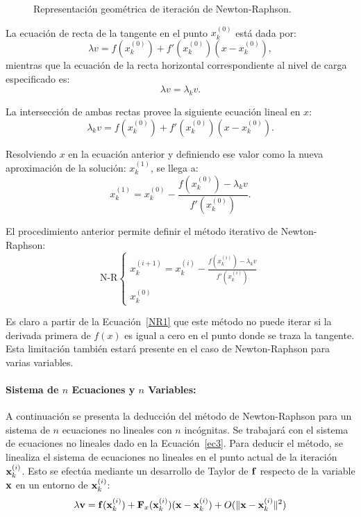 \begin{figure}[htb]
	\centering
   \def\svgwidth{0.7\textwidth}

	\caption{Representación geométrica de iteración de Newton-Raphson.}
	\label{fig:fig2}
\end{figure}

La ecuación de recta de la tangente en el punto $x_k^{(0)}$ está dada por:
%
\begin{equation}
	\lambda v = f(x_k^{(0)})+f'(x_k^{(0)})(x-x_k^{(0)}),
\end{equation}
%
mientras que la ecuación de la recta horizontal correspondiente al nivel de carga especificado es:
%
\begin{equation}
	\lambda v = \lambda_k v.
\end{equation}

La intersección de ambas rectas provee la siguiente ecuación lineal en $x$:
%
\begin{equation}
\lambda_k v = f(x_k^{(0)})+f'(x_k^{(0)})(x-x_k^{(0)}).
\end{equation}

Resolviendo $x$ en la ecuación anterior y definiendo ese valor como la nueva aproximación de la solución: $x_k^{(1)}$,
se llega a:
%
\begin{equation}
x_k^{(1)}=x_k^{(0)}-\frac{f(x_k^{(0)})-\lambda_k v}{f'(x_k^{(0)})}.
\end{equation}

El procedimiento anterior permite definir el método iterativo de Newton-Raphson:
%
\begin{equation}\label{NR1}
\text{N-R}
	\begin{cases} 
	\displaystyle
		x_k^{(i+1)}=x_k^{(i)}-\frac{f(x_k^{(i)})-\lambda_k v}{f'(x_k^{(i)})} \\
		x_k^{(0)}
	\end{cases}
\end{equation}

Es claro a partir de la Ecuación~\eqref{NR1} que este método no puede iterar si la derivada primera de $f(x)$ es igual a cero en el punto donde se traza la tangente. Esta limitación también estará presente en el caso de Newton-Raphson para varias variables.


\paragraph{Sistema de $n$ Ecuaciones y $n$ Variables:} %
%
A continuación se presenta la deducción del método de Newton-Raphson para un sistema de $n$ ecuaciones no lineales con $n$ incógnitas. Se trabajará con el sistema de ecuaciones no lineales dado en la Ecuación~\eqref{ec3}. %
%
Para deducir el método, se linealiza el sistema de ecuaciones no lineales en el punto actual de la iteración ${\bf x}_k^{(i)}$. Esto se efectúa mediante un desarrollo de Taylor de ${\bf f}$ respecto de la variable ${\bf x}$ en un entorno de ${\bf x}_{k}^{(i)}$:
%
\begin{equation}
	\lambda {\bf v} = {\bf f}({\bf x}_k^{(i)})+{\bf F}_x({\bf x}_k^{(i)})({\bf x}-{\bf x}_k^{(i)})+O(\|{\bf x}-{\bf x}_k^{(i)}\|^2)
\end{equation}

